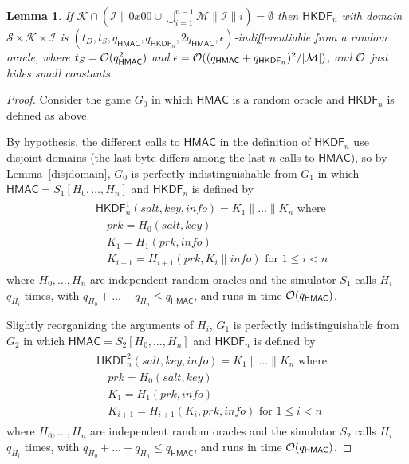 \documentclass[compsoc, conference, letterpaper, 10pt, times]{IEEEtran}
\newcommand{\HKDF}{\mathsf{HKDF}}
\newtheorem{lemma}{Lemma}
\newcommand{\salt}{\mathit{salt}}
\newcommand{\key}{\mathit{key}}
\newcommand{\info}{\mathit{info}}
\newcommand{\prk}{\mathit{prk}}
\newcommand{\hmac}{\mathsf{HMAC}}
\newcommand{\Ssalt}{\mathcal{S}}
\newcommand{\Skey}{\mathcal{K}}
\newcommand{\Sinfo}{\mathcal{I}}
\newcommand{\Smac}{\mathcal{M}}
\newcommand{\ab}{\allowbreak}
\begin{document}
\begin{lemma}\label{lem:hkdfindif}
If $\Skey \cap (\Sinfo \| 0x00 \cup \bigcup_{i = 1}^{n-1}\Smac \| \Sinfo \| i) = \emptyset$
then $\HKDF_n$ with domain $\Ssalt \times \Skey \times \Sinfo$ is
$(t_D, \ab t_S, \ab q_{\hmac}, \ab q_{\HKDF_n}, \ab 2q_{\hmac}, \ab \epsilon)$-indifferentiable from a random oracle,
where $t_S = {\cal O}(q_{\hmac}^2)$ and $\epsilon = {\cal O}((q_{\hmac} + q_{\HKDF_n})^2/|\Smac|)$,
and ${\cal O}$ just hides small constants.
\end{lemma}
\begin{proof}
Consider the game $G_0$ in which $\hmac$ is a random oracle and $\HKDF_n$
is defined as above.

By hypothesis, the different calls to $\hmac$ in the definition of 
$\HKDF_n$ use disjoint domains (the last byte differs among the last
$n$ calls to $\hmac$), so by Lemma~\ref{disjdomain}, $G_0$ is
perfectly indistinguishable from $G_1$ in which
$\hmac = S_1[H_0, \ldots, H_n]$ and $\HKDF_n$ is defined by
\begin{align*}
\begin{split}
&\HKDF^1_n(\salt,\key,\info) = K_1 \| \dots \| K_n \text{ where}\\
&\quad \prk = H_0(\salt,\key)\\
&\quad K_1 = H_1(\prk, \info )\\
&\quad K_{i+1} = H_{i+1}(\prk, K_i \| \info) \text{ for }1 \leq i < n
\end{split}
\end{align*}
where $H_0, \dots, H_n$ are independent random oracles
and the simulator $S_1$ calls $H_i$ $q_{H_i}$ times, with
$q_{H_0} + \dots + q_{H_n} \leq q_{\hmac}$, and runs in time 
${\cal O}(q_{\hmac})$.

Slightly reorganizing the arguments of $H_i$, $G_1$ is
perfectly indistinguishable from $G_2$ in which
$\hmac = S_2[H_0, \ldots, H_n]$ and $\HKDF_n$ is defined by
\begin{align*}
\begin{split}
&\HKDF^2_n(\salt,\key,\info) = K_1 \| \dots \| K_n \text{ where}\\
&\quad \prk = H_0(\salt,\key)\\
&\quad K_1 = H_1(\prk, \info )\\
&\quad K_{i+1} = H_{i+1}(K_i, \prk, \info) \text{ for }1 \leq i < n
\end{split}
\end{align*}
where $H_0, \dots, H_n$ are independent random oracles
and the simulator $S_2$ calls $H_i$ $q_{H_i}$ times, with
$q_{H_0} + \dots + q_{H_n} \leq q_{\hmac}$, and runs in time 
${\cal O}(q_{\hmac})$.


\end{proof}
\end{document}
